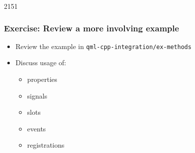 \begin{slide}{2151}\frametitle{Exercise: Review a more involving example}
  \begin{itemize}
  \item Review the example in \texttt{qml-cpp-integration/ex-methods}
  \item Discuss usage of:
    \begin{itemize}
    \item properties
    \item signals
    \item slots
    \item events
    \item registrations
    \end{itemize}
  \end{itemize}
\end{slide}



